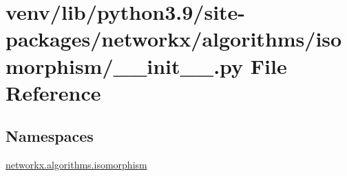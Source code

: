 \hypertarget{venv_2lib_2python3_89_2site-packages_2networkx_2algorithms_2isomorphism_2____init_____8py}{}\section{venv/lib/python3.9/site-\/packages/networkx/algorithms/isomorphism/\+\_\+\+\_\+init\+\_\+\+\_\+.py File Reference}
\label{venv_2lib_2python3_89_2site-packages_2networkx_2algorithms_2isomorphism_2____init_____8py}
\subsection*{Namespaces}
\begin{DoxyCompactItemize}
\item 
 \hyperlink{namespacenetworkx_1_1algorithms_1_1isomorphism}{networkx.\+algorithms.\+isomorphism}
\end{DoxyCompactItemize}
